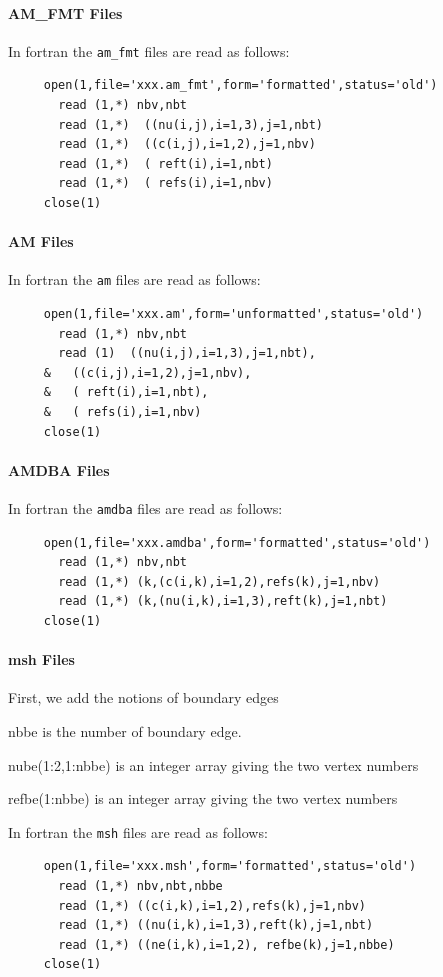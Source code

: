 \documentclass[a4paper,twoside,12pt]{book}
\begin{document}
\paragraph{AM\_FMT Files}\label{AMFMT}
In fortran the  {\tt am\_fmt}  files are read as follows:

\begin{verbatim}
     open(1,file='xxx.am_fmt',form='formatted',status='old')
       read (1,*) nbv,nbt
       read (1,*)  ((nu(i,j),i=1,3),j=1,nbt)
       read (1,*)  ((c(i,j),i=1,2),j=1,nbv)
       read (1,*)  ( reft(i),i=1,nbt)
       read (1,*)  ( refs(i),i=1,nbv)
     close(1)
\end{verbatim}

\paragraph{AM Files}\label{AM}
In fortran the  {\tt am}  files are read as follows:

\begin{verbatim}
     open(1,file='xxx.am',form='unformatted',status='old')
       read (1,*) nbv,nbt
       read (1)  ((nu(i,j),i=1,3),j=1,nbt),
     &   ((c(i,j),i=1,2),j=1,nbv),
     &   ( reft(i),i=1,nbt),
     &   ( refs(i),i=1,nbv)
     close(1)
\end{verbatim}
\paragraph{AMDBA Files}\label{AMDBA}
In fortran the  {\tt amdba}  files are read as follows:
\begin{verbatim}
     open(1,file='xxx.amdba',form='formatted',status='old')
       read (1,*) nbv,nbt
       read (1,*) (k,(c(i,k),i=1,2),refs(k),j=1,nbv)
       read (1,*) (k,(nu(i,k),i=1,3),reft(k),j=1,nbt)
     close(1)
\end{verbatim}
\paragraph{msh Files}\label{MSH}
First, we add the notions of boundary edges
  \begin{ttlist}
  \item [nbbe] is the number of boundary edge.
  \item [nube(1:2,1:nbbe)] is an integer array giving the two vertex numbers
  \item [refbe(1:nbbe)] is an integer array giving the two vertex numbers
  \end{ttlist}
In fortran the  {\tt msh}  files are read as follows:
\begin{verbatim}
     open(1,file='xxx.msh',form='formatted',status='old')
       read (1,*) nbv,nbt,nbbe
       read (1,*) ((c(i,k),i=1,2),refs(k),j=1,nbv)
       read (1,*) ((nu(i,k),i=1,3),reft(k),j=1,nbt)
       read (1,*) ((ne(i,k),i=1,2), refbe(k),j=1,nbbe)
     close(1)
\end{verbatim}
\end{document}
